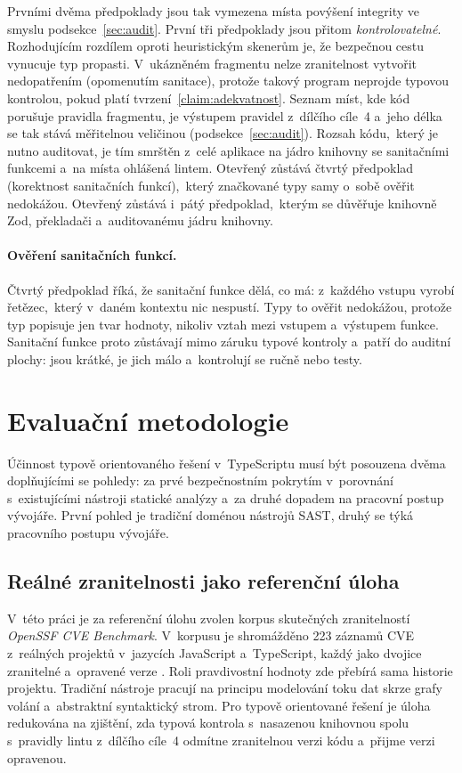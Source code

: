 Prvními dvěma předpoklady jsou tak vymezena místa povýšení integrity ve smyslu podsekce~\ref{sec:audit}. První tři předpoklady jsou přitom \emph{kontrolovatelné}. Rozhodujícím rozdílem oproti heuristickým skenerům je, že bezpečnou cestu vynucuje typ propasti. V~ukázněném fragmentu nelze zranitelnost vytvořit nedopatřením (opomenutím sanitace), protože takový program neprojde typovou kontrolou, pokud platí tvrzení~\ref{claim:adekvatnost}. Seznam míst, kde kód porušuje pravidla fragmentu, je výstupem pravidel z~dílčího cíle~4 a~jeho délka se tak stává měřitelnou veličinou (podsekce~\ref{sec:audit}). Rozsah kódu,~který je nutno auditovat, je tím smrštěn z~celé aplikace na jádro knihovny se sanitačními funkcemi a~na místa ohlášená lintem. Otevřený zůstává čtvrtý předpoklad (korektnost sanitačních funkcí),~který značkované typy samy o~sobě ověřit nedokážou. Otevřený zůstává i~pátý předpoklad,~kterým se důvěřuje knihovně Zod, překladači a~auditovanému jádru knihovny.

\paragraph{Ověření sanitačních funkcí.}
\label{sec:formalni-overeni}
Čtvrtý předpoklad říká, že sanitační funkce dělá, co má: z~každého vstupu vyrobí řetězec,~který v~daném kontextu nic nespustí. Typy to ověřit nedokážou, protože typ popisuje jen tvar hodnoty, nikoliv vztah mezi vstupem a~výstupem funkce. Sanitační funkce proto zůstávají mimo záruku typové kontroly a~patří do auditní plochy: jsou krátké, je jich málo a~kontrolují se ručně nebo testy.

\section{Evaluační metodologie}

Účinnost typově orientovaného řešení v~TypeScriptu musí být posouzena dvěma doplňujícími se pohledy: za prvé bezpečnostním pokrytím v~porovnání s~existujícími nástroji statické analýzy a~za druhé dopadem na pracovní postup vývojáře. První pohled je tradiční doménou nástrojů SAST, druhý se týká pracovního postupu vývojáře.

\subsection{Reálné zranitelnosti jako referenční úloha}

V~této práci je za referenční úlohu zvolen korpus skutečných zranitelností \emph{OpenSSF CVE Benchmark}. V~korpusu je shromážděno 223 záznamů CVE z~reálných projektů v~jazycích JavaScript a~TypeScript, každý jako dvojice zranitelné a~opravené verze \parencite{ossfCveBenchmark}. Roli pravdivostní hodnoty zde přebírá sama historie projektu. Tradiční nástroje pracují na principu modelování toku dat skrze grafy volání a~abstraktní syntaktický strom. Pro typově orientované řešení je úloha redukována na zjištění, zda typová kontrola s~nasazenou knihovnou spolu s~pravidly lintu z~dílčího cíle~4 odmítne zranitelnou verzi kódu a~přijme verzi opravenou.

